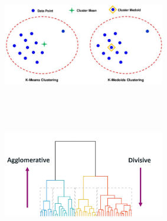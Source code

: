 \begin{figure}
  \centering
  \begin{minipage}[t]{.45\textwidth}
    \centering
    \includegraphics[width=200pt,height=150pt]{pictures/The-graphical-representation-of-the-difference-between-the-k-means-and-k-medoids_W640.jpg}
    \label{fig:kmean-kmedoid}
  \end{minipage}%
  \hspace{1cm}
  \begin{minipage}[t]{.45\textwidth}
    \centering
    \includegraphics[width=200pt,height=150pt]{pictures/dendogram.png}
    \label{fig:dendogram}
  \end{minipage}
\end{figure}
